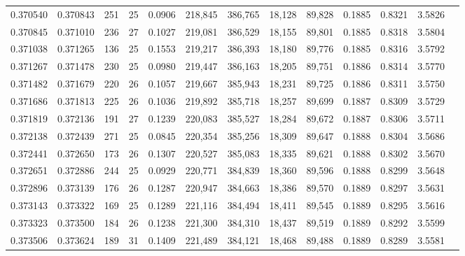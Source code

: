 \begin{tabular}{rrrrrrrrrrrrr}
0.370540 & 0.370843 &   251 &  25 &                                     0.0906 & 218,845 & 386,765 &  18,128 &  89,828 & 0.1885 & 0.8321 & 3.5826 \\
0.370845 & 0.371010 &   236 &  27 &                                     0.1027 & 219,081 & 386,529 &  18,155 &  89,801 & 0.1885 & 0.8318 & 3.5804 \\
0.371038 & 0.371265 &   136 &  25 &                                     0.1553 & 219,217 & 386,393 &  18,180 &  89,776 & 0.1885 & 0.8316 & 3.5792 \\
0.371267 & 0.371478 &   230 &  25 &                                     0.0980 & 219,447 & 386,163 &  18,205 &  89,751 & 0.1886 & 0.8314 & 3.5770 \\
0.371482 & 0.371679 &   220 &  26 &                                     0.1057 & 219,667 & 385,943 &  18,231 &  89,725 & 0.1886 & 0.8311 & 3.5750 \\
0.371686 & 0.371813 &   225 &  26 &                                     0.1036 & 219,892 & 385,718 &  18,257 &  89,699 & 0.1887 & 0.8309 & 3.5729 \\
0.371819 & 0.372136 &   191 &  27 &                                     0.1239 & 220,083 & 385,527 &  18,284 &  89,672 & 0.1887 & 0.8306 & 3.5711 \\
0.372138 & 0.372439 &   271 &  25 &                                     0.0845 & 220,354 & 385,256 &  18,309 &  89,647 & 0.1888 & 0.8304 & 3.5686 \\
0.372441 & 0.372650 &   173 &  26 &                                     0.1307 & 220,527 & 385,083 &  18,335 &  89,621 & 0.1888 & 0.8302 & 3.5670 \\
0.372651 & 0.372886 &   244 &  25 &                                     0.0929 & 220,771 & 384,839 &  18,360 &  89,596 & 0.1888 & 0.8299 & 3.5648 \\
0.372896 & 0.373139 &   176 &  26 &                                     0.1287 & 220,947 & 384,663 &  18,386 &  89,570 & 0.1889 & 0.8297 & 3.5631 \\
0.373143 & 0.373322 &   169 &  25 &                                     0.1289 & 221,116 & 384,494 &  18,411 &  89,545 & 0.1889 & 0.8295 & 3.5616 \\
0.373323 & 0.373500 &   184 &  26 &                                     0.1238 & 221,300 & 384,310 &  18,437 &  89,519 & 0.1889 & 0.8292 & 3.5599 \\
0.373506 & 0.373624 &   189 &  31 &                                     0.1409 & 221,489 & 384,121 &  18,468 &  89,488 & 0.1889 & 0.8289 & 3.5581 \\

\end{tabular}
